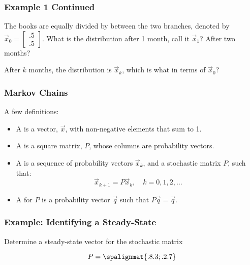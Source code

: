 \begin{frame}\frametitle{Example 1 Continued}

    The books are equally divided by between the two branches, denoted by $\vec x_0 = \begin{bmatrix}
    .5 \\ .5
    \end{bmatrix}$.  What is the distribution after 1 month, call it $\vec x_1$?  After two months? 

    \vspace{2cm}
    
     After $k$ months, the distribution is $\vec x_k$, which is what in terms of $\vec x_0$? 
    
    \vspace{2cm}
    
\end{frame}


\begin{frame}\frametitle{Markov Chains}

    A few definitions: 
    \begin{itemize}
        \item<1-> A  is a vector, $\vec x$, with non-negative elements that sum to 1.
        \item<2-> A  is a square matrix, $P$, whose columns are probability vectors. 
        \item<3-> A  is a sequence of probability vectors $\vec x_k$, and a stochastic matrix $P$, such that:$$\vec x_{k+1} = P\vec x_k, \quad k = 0, 1, 2, \ldots $$
        \item<4-> A  for $P$ is a probability vector $\vec{q}$ such that $P\vec q = \vec q$. 
    \end{itemize}
    
\end{frame}

\begin{frame}\frametitle{Example: Identifying a Steady-State}

    Determine a steady-state vector for the stochastic matrix
    
    $$P = \spalignmat{ .8 .3 ; .2 .7 }$$

\end{frame}

